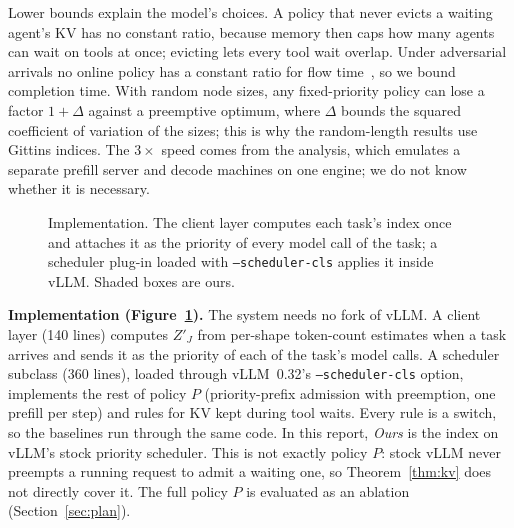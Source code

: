 \documentclass{article}
\begin{document}
Lower bounds explain the model's choices. A policy that never evicts a waiting agent's KV has no constant ratio,
because memory then caps how many agents can wait on tools at once; evicting lets every tool wait overlap. Under
adversarial arrivals no online policy has a constant ratio for flow time~\cite{jaillet2025online}, so we bound
completion time. With random node sizes, any fixed-priority policy can lose a factor $1 + \Delta$ against a
preemptive optimum, where $\Delta$ bounds the squared coefficient of variation of the sizes; this is why the
random-length results use Gittins indices. The $3\times$ speed comes from the analysis, which emulates a separate
prefill server and decode machines on one engine; we do not know whether it is necessary.

\begin{figure}[t]
\centering
{}
\caption{Implementation. The client layer computes each task's index once and attaches it as the priority of
every model call of the task; a scheduler plug-in loaded with \texttt{--scheduler-cls} applies it inside vLLM.
Shaded boxes are ours.}
\label{fig:design}
\end{figure}

\textbf{Implementation (Figure~\ref{fig:design}).} The system needs no fork of vLLM. A client layer (140 lines)
computes $Z'_J$ from per-shape token-count estimates when a task arrives and sends it as the priority of each of
the task's model calls. A scheduler subclass (360 lines), loaded through vLLM~0.32's \texttt{--scheduler-cls}
option, implements the rest of policy $P$ (priority-prefix admission with preemption, one prefill per step) and
rules for KV kept during tool waits. Every rule is a switch, so the baselines run through the same code. In this
report, \emph{Ours} is the index on vLLM's stock priority scheduler. This is not exactly policy $P$: stock vLLM
never preempts a running request to admit a waiting one, so Theorem~\ref{thm:kv} does not directly cover it. The
full policy $P$ is evaluated as an ablation (Section~\ref{sec:plan}).
\end{document}

